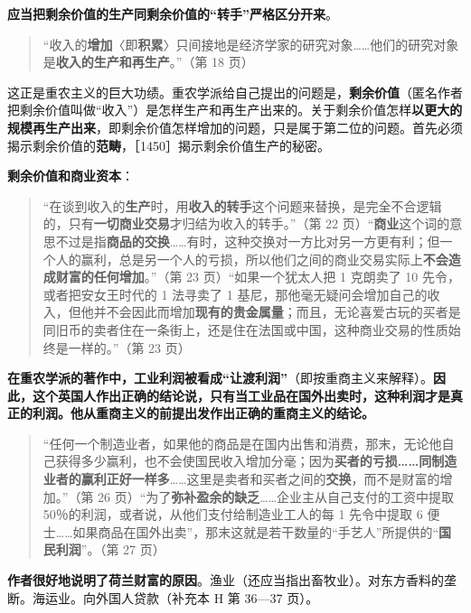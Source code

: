 \textbf{应当把剩余价值的生产同剩余价值的“转手”严格区分开来}。

\begin{quote}“收入的\textbf{增加}〈即\textbf{积累}〉只间接地是经济学家的研究对象……他们的研究对象是\textbf{收入的生产和再生产}。”（第 18 页）\end{quote}

这正是重农主义的巨大功绩。重农学派给自己提出的问题是，\textbf{剩余价值}（匿名作者把剩余价值叫做“收入”）是怎样生产和再生产出来的。关于剩余价值怎样\textbf{以更大的规模再生产出来}，即剩余价值怎样增加的问题，只是属于第二位的问题。首先必须揭示剩余价值的\textbf{范畴}，［1450］揭示剩余价值生产的秘密。

\textbf{剩余价值和商业资本}：

\begin{quote}“在谈到收入的\textbf{生产}时，用\textbf{收入的转手}这个问题来替换，是完全不合逻辑的，只有\textbf{一切商业交易}才归结为收入的转手。”（第 22 页）“\textbf{商业}这个词的意思不过是指\textbf{商品的交换}……有时，这种交换对一方比对另一方更有利；但一个人的赢利，总是另一个人的亏损，所以他们之间的商业交易实际上\textbf{不会造成财富的任何增加}。”（第 23 页）“如果一个犹太人把 1 克朗卖了 10 先令，或者把安女王时代的 1 法寻卖了 1 基尼，那他毫无疑问会增加自己的收入，但他并不会因此而增加\textbf{现有的贵金属量}；而且，无论喜爱古玩的买者是同旧币的卖者住在一条街上，还是住在法国或中国，这种商业交易的性质始终是一样的。”（第 23 页）\end{quote}

\textbf{在重农学派的著作中，工业利润被看成“让渡利润”}（即按重商主义来解释）。\textbf{因此，这个英国人作出正确的结论说，只有当工业品在国外出卖时，这种利润才是真正的利润。他从重商主义的前提出发作出正确的重商主义的结论。}

\begin{quote}“任何一个制造业者，如果他的商品是在国内出售和消费，那末，无论他自己获得多少赢利，也不会使国民收入增加分毫；因为\textbf{买者的亏损……同制造业者的赢利正好一样多}……这里是卖者和买者之间的\textbf{交换}，而不是财富的增加。”（第 26 页）“为了\textbf{弥补盈余的缺乏}……企业主从自己支付的工资中提取 50％的利润，或者说，从他们支付给制造业工人的每 1 先令中提取 6 便士……如果商品在国外出卖”，那末这就是若干数量的“手艺人”所提供的“\textbf{国民利润}”。（第 27 页）\end{quote}

\textbf{作者很好地说明了荷兰财富的原因}。渔业（还应当指出畜牧业）。对东方香料的垄断。海运业。向外国人贷款（补充本 H 第 36—37 页）。

